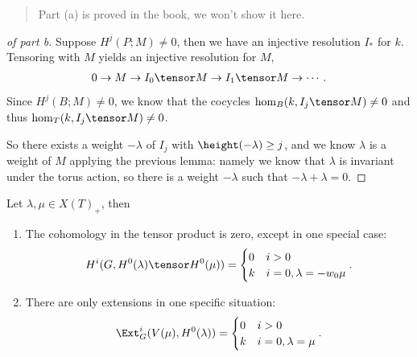 \begin{quote}
Part (a) is proved in the book, we won't show it here.
\end{quote}

\begin{proof}[of part b]

Suppose \(H^j(P; M) \neq 0\), then we have an injective resolution
\(I_*\) for \(k\). Tensoring with \(M\) yields an injective resolution
for \(M\),
\begin{align*}  
0 \to M \to I_0\tensor M \to I_1 \tensor M \to \cdots
.\end{align*} Since \(H^j(B; M) \neq 0\), we know that the cocycles
\(\hom_B(k, I_j\tensor M) \neq 0\) and thus
\(\hom_T(k, I_j\tensor M) \neq 0\).

So there exists a weight \(-\lambda\) of \(I_j\) with
\(\height(-\lambda) \geq j\), and we know \(\lambda\) is a weight of
\(M\) applying the previous lemma: namely we know that \(\lambda\) is
invariant under the torus action, so there is a weight \(-\lambda\) such
that \(-\lambda + \lambda = 0\).

\end{proof}


\begin{theorem}[?]

Let \(\lambda, \mu \in X(T)_+\), then

\begin{enumerate}
\def\labelenumi{\arabic{enumi}.}
\item
  The cohomology in the tensor product is zero, except in one special
  case:
  \begin{align*}  
  H^i(G, H^0(\lambda) \tensor H^0(\mu))
  =
  \begin{cases}
  0 & i>0 \\
  k & i=0, \lambda = -w_0\mu
  \end{cases}
  .\end{align*}
\item
  There are only extensions in one specific situation:
  \begin{align*}  
  \Ext_G^i(V(\mu), H^0(\lambda)) = 
  \begin{cases}
  0 & i> 0 \\
  k & i=0, \lambda = \mu
  \end{cases}
  .\end{align*}
\end{enumerate}

\end{theorem}

